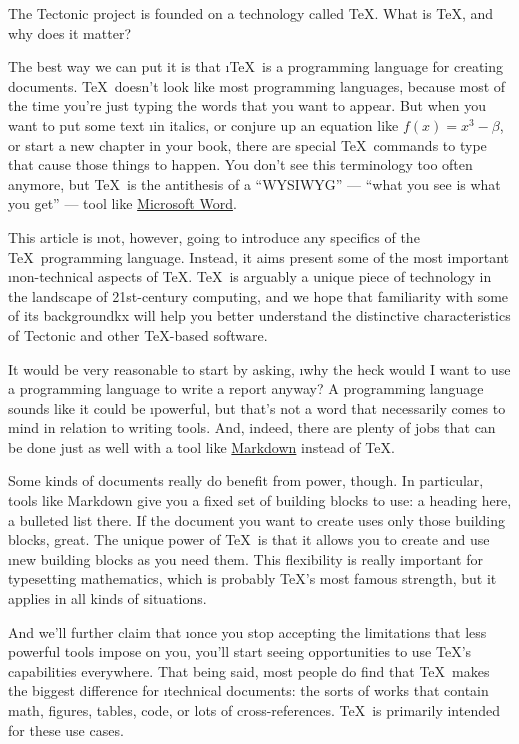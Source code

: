 
The Tectonic project is founded on a technology called \TeX. What is \TeX, and
why does it matter?

The best way we can put it is that \i{\TeX\ is a programming language for
creating documents}. \TeX\ doesn't look like most programming languages, because
most of the time you're just typing the words that you want to appear. But when
you want to put some text \i{in italics}, or conjure up an equation like $f(x) =
x^3 - \beta$, or start a new chapter in your book, there are special \TeX\
commands to type that cause those things to happen. You don’t see this
terminology too often anymore, but \TeX\ is the antithesis of a “WYSIWYG” —
“what you see is what you get” — tool like
\href{https://www.microsoft.com/en-us/microsoft-365/word}{Microsoft Word}.

This article is \i{not}, however, going to introduce any specifics of the \TeX\
programming language. Instead, it aims present some of the most important
\i{non-technical} aspects of \TeX. \TeX\ is arguably a unique piece of
technology in the landscape of 21st-century computing, and we hope that
familiarity with some of its backgroundkx will help you better understand the
distinctive characteristics of Tectonic and other \TeX-based software.

It would be very reasonable to start by asking, \i{why the heck would I want to
use a programming language to write a report anyway?} A programming language
sounds like it could be \i{powerful}, but that's not a word that necessarily
comes to mind in relation to writing tools. And, indeed, there are plenty of
jobs that can be done just as well with a tool like
\href{https://en.wikipedia.org/wiki/Markdown}{Markdown} instead of \TeX.

Some kinds of documents really do benefit from power, though. In particular,
tools like Markdown give you a fixed set of building blocks to use: a heading
here, a bulleted list there. If the document you want to create uses only those
building blocks, great. The unique power of \TeX\ is that it allows you to
create and use \i{new} building blocks as you need them. This flexibility is
really important for typesetting mathematics, which is probably \TeX's most
famous strength, but it applies in all kinds of situations.

And we'll further claim that \i{once you stop accepting the limitations that
less powerful tools impose on you, you'll start seeing opportunities to use
\TeX's capabilities everywhere}. That being said, most people do find that \TeX\
makes the biggest difference for \i{technical documents}: the sorts of works
that contain math, figures, tables, code, or lots of cross-references. \TeX\ is
primarily intended for these use cases.

